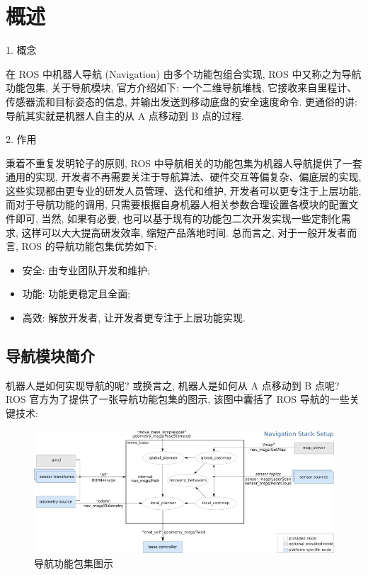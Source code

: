 \documentclass[openany, fontset=windowsold]{ctexbook}
\theoremstyle{kaiti}
\theoremstyle{normal}
\begin{document}
\section{概述}

1. 概念

在 ROS 中机器人导航 (Navigation) 由多个功能包组合实现, ROS 中又称之为导航功能包集, 关于导航模块, 官方介绍如下: 一个二维导航堆栈, 它接收来自里程计、传感器流和目标姿态的信息, 并输出发送到移动底盘的安全速度命令. 更通俗的讲: 导航其实就是机器人自主的从 A 点移动到 B 点的过程.

2. 作用

秉着不重复发明轮子的原则, ROS 中导航相关的功能包集为机器人导航提供了一套通用的实现, 开发者不再需要关注于导航算法、硬件交互等偏复杂、偏底层的实现, 这些实现都由更专业的研发人员管理、迭代和维护, 开发者可以更专注于上层功能, 而对于导航功能的调用, 只需要根据自身机器人相关参数合理设置各模块的配置文件即可, 当然, 如果有必要, 也可以基于现有的功能包二次开发实现一些定制化需求, 这样可以大大提高研发效率, 缩短产品落地时间. 总而言之, 对于一般开发者而言, ROS 的导航功能包集优势如下:

\begin{itemize}
  \item 安全: 由专业团队开发和维护;
  \item 功能: 功能更稳定且全面;
  \item 高效: 解放开发者, 让开发者更专注于上层功能实现.
\end{itemize}

\subsection{导航模块简介}

机器人是如何实现导航的呢? 或换言之, 机器人是如何从 A 点移动到 B 点呢? ROS 官方为了提供了一张导航功能包集的图示, 该图中囊括了 ROS 导航的一些关键技术:

\begin{figure}[!ht]
  \centering
  \includegraphics[width=.95\textwidth]{ros_nav_architecture.png}
  \caption{导航功能包集图示}
  \label{fig:ros_nav_architecture}
\end{figure}
\end{document}
